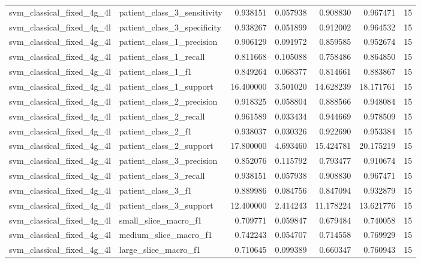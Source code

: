 \begin{tabular}{llrrrrr}
svm_classical_fixed_4g_4l & patient_class_3_sensitivity & 0.938151 & 0.057938 & 0.908830 & 0.967471 & 15 \\
svm_classical_fixed_4g_4l & patient_class_3_specificity & 0.938267 & 0.051899 & 0.912002 & 0.964532 & 15 \\
svm_classical_fixed_4g_4l & patient_class_1_precision & 0.906129 & 0.091972 & 0.859585 & 0.952674 & 15 \\
svm_classical_fixed_4g_4l & patient_class_1_recall & 0.811668 & 0.105088 & 0.758486 & 0.864850 & 15 \\
svm_classical_fixed_4g_4l & patient_class_1_f1 & 0.849264 & 0.068377 & 0.814661 & 0.883867 & 15 \\
svm_classical_fixed_4g_4l & patient_class_1_support & 16.400000 & 3.501020 & 14.628239 & 18.171761 & 15 \\
svm_classical_fixed_4g_4l & patient_class_2_precision & 0.918325 & 0.058804 & 0.888566 & 0.948084 & 15 \\
svm_classical_fixed_4g_4l & patient_class_2_recall & 0.961589 & 0.033434 & 0.944669 & 0.978509 & 15 \\
svm_classical_fixed_4g_4l & patient_class_2_f1 & 0.938037 & 0.030326 & 0.922690 & 0.953384 & 15 \\
svm_classical_fixed_4g_4l & patient_class_2_support & 17.800000 & 4.693460 & 15.424781 & 20.175219 & 15 \\
svm_classical_fixed_4g_4l & patient_class_3_precision & 0.852076 & 0.115792 & 0.793477 & 0.910674 & 15 \\
svm_classical_fixed_4g_4l & patient_class_3_recall & 0.938151 & 0.057938 & 0.908830 & 0.967471 & 15 \\
svm_classical_fixed_4g_4l & patient_class_3_f1 & 0.889986 & 0.084756 & 0.847094 & 0.932879 & 15 \\
svm_classical_fixed_4g_4l & patient_class_3_support & 12.400000 & 2.414243 & 11.178224 & 13.621776 & 15 \\
svm_classical_fixed_4g_4l & small_slice_macro_f1 & 0.709771 & 0.059847 & 0.679484 & 0.740058 & 15 \\
svm_classical_fixed_4g_4l & medium_slice_macro_f1 & 0.742243 & 0.054707 & 0.714558 & 0.769929 & 15 \\
svm_classical_fixed_4g_4l & large_slice_macro_f1 & 0.710645 & 0.099389 & 0.660347 & 0.760943 & 15 \\
\bottomrule
\end{tabular}
